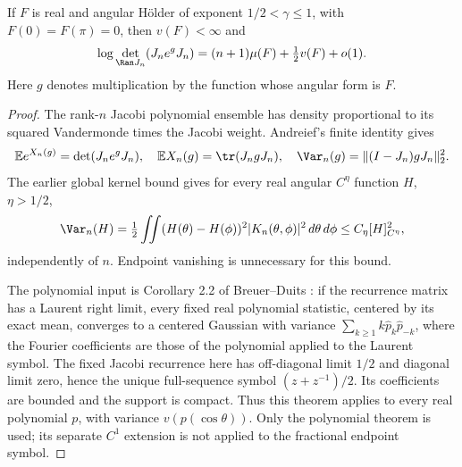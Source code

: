 \begin{proposition}\label{prop:scalarconstant}
If $F$ is real and angular H\"older of exponent
$1/2<\gamma\le1$, with $F(0)=F(\pi)=0$, then $v(F)<\infty$ and
\begin{equation}\label{scalarconstant}
 \log\det_{\Ran J_n}(J_ne^gJ_n)
     =(n+1)\mu(F)+\tfrac12v(F)+o(1).
\end{equation}
Here $g$ denotes multiplication by the function whose angular form is $F$.
\end{proposition}
\begin{proof}
The rank-$n$ Jacobi polynomial ensemble has density proportional to
its squared Vandermonde times the Jacobi weight. Andreief's finite
identity gives
\[
 \mathbb E e^{X_n(g)}=\det(J_ne^gJ_n),\quad
 \mathbb E X_n(g)=\tr(J_ngJ_n),\quad
 \Var_n(g)=\|(I-J_n)gJ_n\|_2^2.
\]
The earlier global kernel bound gives for every real angular
$C^\eta$ function $H$, $\eta>1/2$,
\begin{equation}\label{varianceholder}
 \Var_n(H)=\tfrac12\iint(H(\theta)-H(\phi))^2
                      |K_n(\theta,\phi)|^2\,d\theta\,d\phi
 \le C_\eta[H]_{C^\eta}^2,
\end{equation}
independently of $n$. Endpoint vanishing is unnecessary for this bound.

The polynomial input is Corollary 2.2 of Breuer--Duits
\cite{bd}: if the recurrence matrix has a Laurent right limit,
every fixed real polynomial statistic, centered by its exact mean,
converges to a centered Gaussian with variance
$\sum_{k\ge1}k\widehat p_k\widehat p_{-k}$, where the Fourier
coefficients are those of the polynomial applied to the Laurent symbol.
The fixed Jacobi recurrence here has off-diagonal limit $1/2$ and
diagonal limit zero, hence the unique full-sequence symbol
$(z+z^{-1})/2$. Its coefficients are bounded and the support is compact.
Thus this theorem applies to every real polynomial $p$, with variance
$v(p(\cos\theta))$. Only the polynomial theorem is used; its separate
$C^1$ extension is not applied to the fractional endpoint symbol.


\end{proof}
